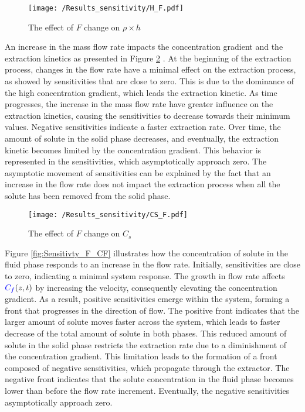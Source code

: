 \documentclass[../Article_Model_Parameters.tex]{subfiles}
\begin{document}
    \begin{figure}[h!]
    	\centering
    	\texttt{[image: /Results\_sensitivity/H\_F.pdf]}
    	\caption{The effect of $F$ change on $\rho \times h$}
    	\label{fig:Sensitivty_F_H}
    \end{figure}
   
   An increase in the mass flow rate impacts the concentration gradient and the extraction kinetics as presented in Figure \ref{fig:Sensitivty_F_CS} . At the beginning of the extraction process, changes in the flow rate have a minimal effect on the extraction process, as showed by sensitivities that are close to zero. This is due to the dominance of the high concentration gradient, which leads the extraction kinetic. As time progresses, the increase in the mass flow rate have greater influence on the extraction kinetics, causing the sensitivities to decrease towards their minimum values. Negative sensitivities indicate a faster extraction rate. Over time, the amount of solute in the solid phase decreases, and eventually, the extraction kinetic becomes limited by the concentration gradient. This behavior is represented in the sensitivities, which asymptotically approach zero. The asymptotic movement of sensitivities can be explained by the fact that an increase in the flow rate does not impact the extraction process when all the solute has been removed from the solid phase.
    
    \begin{figure}[h!]
    	\centering
    	\texttt{[image: /Results\_sensitivity/CS\_F.pdf]}
    	\caption{The effect of $F$ change on $C_s$}
    	\label{fig:Sensitivty_F_CS}
    \end{figure}
    
    Figure \ref{fig:Sensitivty_F_CF} illustrates how the concentration of solute in the fluid phase responds to an increase in the flow rate. Initially, sensitivities are close to zero, indicating a minimal system response. The growth in flow rate affects ${\color{blue}C_f}(z,t)$ by increasing the velocity, consequently elevating the concentration gradient. As a result, positive sensitivities emerge within the system, forming a front that progresses in the direction of flow. The positive front indicates that the larger amount of solute moves faster across the system, which leads to faster decrease of the total amount of solute in both phases. This reduced amount of solute in the solid phase restricts the extraction rate due to a diminishment of the concentration gradient. This limitation leads to the formation of a front composed of negative sensitivities, which propagate through the extractor. The negative front indicates that the solute concentration in the fluid phase becomes lower than before the flow rate increment. Eventually, the negative sensitivities asymptotically approach zero.
    
\end{document}
